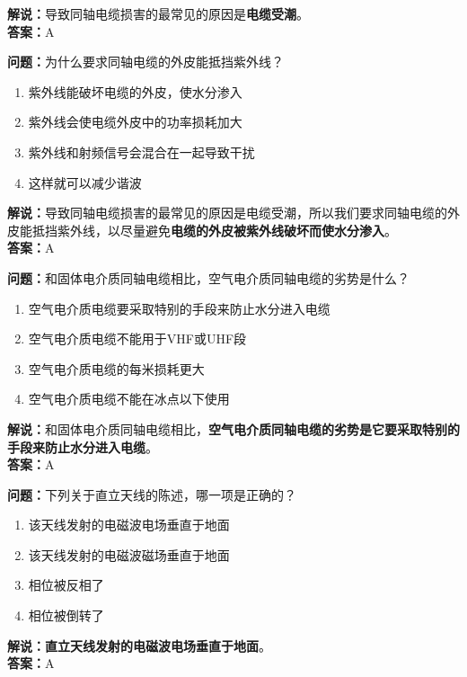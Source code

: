 \textbf{解说：}导致同轴电缆损害的最常见的原因是\textbf{电缆受潮}。\\\textbf{答案：}A



\textbf{问题：}为什么要求同轴电缆的外皮能抵挡紫外线？

\begin{enumerate}[label=\Alph*), leftmargin=1cm]
	\item 紫外线能破坏电缆的外皮，使水分渗入
	\item 紫外线会使电缆外皮中的功率损耗加大
	\item 紫外线和射频信号会混合在一起导致干扰
	\item 这样就可以减少谐波
\end{enumerate}

\textbf{解说：}导致同轴电缆损害的最常见的原因是电缆受潮，所以我们要求同轴电缆的外皮能抵挡紫外线，以尽量避免\textbf{电缆的外皮被紫外线破坏而使水分渗入}。\\\textbf{答案：}A%



\textbf{问题：}和固体电介质同轴电缆相比，空气电介质同轴电缆的劣势是什么？

\begin{enumerate}[label=\Alph*), leftmargin=1cm]
	\item 空气电介质电缆要采取特别的手段来防止水分进入电缆
	\item 空气电介质电缆不能用于VHF或UHF段
	\item 空气电介质电缆的每米损耗更大
	\item 空气电介质电缆不能在冰点以下使用
\end{enumerate}

\textbf{解说：}和固体电介质同轴电缆相比，\textbf{空气电介质同轴电缆的劣势是它要采取特别的手段来防止水分进入电缆}。\\\textbf{答案：}A%



\textbf{问题：}下列关于直立天线的陈述，哪一项是正确的？

\begin{enumerate}[label=\Alph*), leftmargin=1cm]
	\item 该天线发射的电磁波电场垂直于地面
	\item 该天线发射的电磁波磁场垂直于地面
	\item 相位被反相了
	\item 相位被倒转了
\end{enumerate}

\textbf{解说：}\textbf{直立天线发射的电磁波电场垂直于地面}。\\\textbf{答案：}A%



